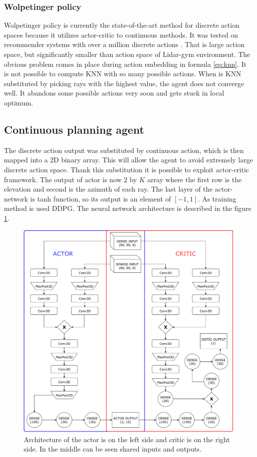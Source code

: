 \subsubsection{Wolpetinger policy}
Wolpetinger policy is currently the state-of-the-art method for discrete action spaces because it utilizes actor-critic to continuous methods. It was tested on recommender systems with over a million discrete actions \cite{dulac2015}. That is large action space, but significantly smaller than action space of Lidar-gym environment. The obvious problem comes in place during action embedding in formula \eqref{eq:knn}. It is not possible to compute KNN with so many possible actions. When is KNN substituted by picking rays with the highest value, the agent does not converge well. It abandons some possible actions very soon and gets stuck in local optimum.

\clearpage
\subsection{Continuous planning agent}
The discrete action output was substituted by continuous action, which is then mapped into a 2D binary array. This will allow the agent to avoid extremely large discrete action space. Thank this substitution it is possible to exploit actor-critic framework. The output of actor is now $2$ by $K$ array where the first row is the elevation and second is the azimuth of each ray. The last layer of the actor-network is tanh function, so its output is an element of $[-1, 1]$. As training method is used DDPG. The neural network architecture is described in the figure \ref{fig:ddpg}.

\begin{figure}[!h]
\centering
\includegraphics[scale=0.55]{fig/ddpg.pdf}
\caption[DDPG architecture]{Architecture of the actor is on the left side and critic is on the right side. In the middle can be seen shared inputs and outputs.}
\label{fig:ddpg}
\end{figure}

